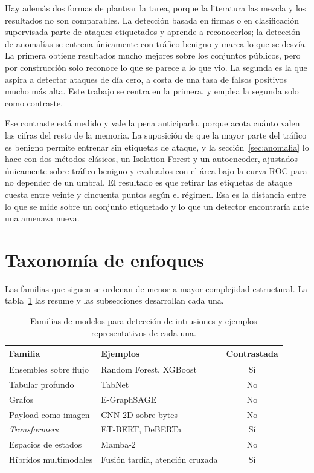 Hay además dos formas de plantear la tarea, porque la literatura
las mezcla y los resultados no son comparables. La detección basada en firmas o
en clasificación supervisada parte de ataques etiquetados y aprende a
reconocerlos; la detección de anomalías se entrena únicamente con tráfico
benigno y marca lo que se desvía. La primera obtiene resultados mucho mejores
sobre los conjuntos públicos, pero por construcción solo reconoce lo que se
parece a lo que vio. La segunda es la que aspira a detectar ataques de día cero,
a costa de una tasa de falsos positivos mucho más alta. Este trabajo se centra en
la primera, y emplea la segunda solo como contraste.

Ese contraste está medido y vale la pena anticiparlo, porque acota cuánto valen las
cifras del resto de la memoria. La suposición de que la mayor parte del tráfico
es benigno permite entrenar sin etiquetas de ataque, y la
sección~\ref{sec:anomalia} lo hace con dos métodos clásicos, un Isolation Forest
y un autoencoder, ajustados únicamente sobre tráfico benigno y evaluados con el
área bajo la curva ROC para no depender de un umbral. El resultado es que
retirar las etiquetas de ataque cuesta entre veinte y cincuenta puntos según el
régimen. Esa es la distancia entre lo que se mide sobre un conjunto etiquetado y
lo que un detector encontraría ante una amenaza nueva.

\section{Taxonomía de enfoques}
\label{sec:sota-taxonomia}

Las familias que siguen se ordenan de menor a mayor complejidad estructural. La
tabla~\ref{tab:taxonomia} las resume y las subsecciones desarrollan cada una.

\begin{table}[htbp]
  \centering
  \caption[Familias de modelos y cuáles se han contrastado]{Familias de modelos
  para detección de intrusiones y ejemplos representativos de cada una.}
  \label{tab:taxonomia}
  \begin{tabular}{llc}
    \toprule
    \textbf{Familia} & \textbf{Ejemplos} & \textbf{Contrastada} \\
    \midrule
    Ensembles sobre flujo   & Random Forest, XGBoost   & Sí \\
    Tabular profundo        & TabNet                   & No \\
    Grafos                  & E-GraphSAGE              & No \\
    Payload como imagen     & CNN 2D sobre bytes       & No \\
    \emph{Transformers}     & ET-BERT, DeBERTa         & Sí \\
    Espacios de estados     & Mamba-2                  & No \\
    Híbridos multimodales   & Fusión tardía, atención cruzada & Sí \\
    \bottomrule
  \end{tabular}
\end{table}

